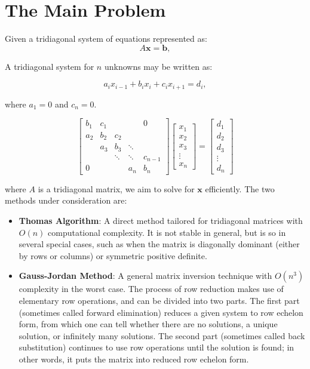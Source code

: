 \documentclass[a4paper,12pt]{article}
\begin{document}
\section*{The Main Problem}
Given a tridiagonal system of equations represented as:
\[
A \mathbf{x} = \mathbf{b},
\]

A tridiagonal system for \( n \) unknowns may be written as:

\[
a_i x_{i-1} + b_i x_i + c_i x_{i+1} = d_i,
\]

where \( a_1 = 0 \) and \( c_n = 0 \).

\[
\begin{bmatrix}
b_{1} & c_{1} & & & 0 \\
a_{2} & b_{2} & c_{2} & & \\
& a_{3} & b_{3} & \ddots & \\
& & \ddots & \ddots & c_{n-1} \\
0 & & & a_{n} & b_{n}
\end{bmatrix}
\begin{bmatrix}
x_{1} \\ x_{2} \\ x_{3} \\ \vdots \\ x_{n}
\end{bmatrix}
=
\begin{bmatrix}
d_{1} \\ d_{2} \\ d_{3} \\ \vdots \\ d_{n}
\end{bmatrix}
\]

where \(A\) is a tridiagonal matrix, we aim to solve for \(\mathbf{x}\) efficiently. The two methods under consideration are:
\begin{itemize}
    \item \textbf{Thomas Algorithm}: A direct method tailored for tridiagonal matrices with \(O(n)\) computational complexity. It is not stable in general, but is so in several special cases, such as when the matrix is diagonally dominant (either by rows or columns) or symmetric positive definite.
    \item \textbf{Gauss-Jordan Method}: A general matrix inversion technique with \(O(n^3)\) complexity in the worst case. The process of row reduction makes use of elementary row operations, and can be divided into two parts. The first part (sometimes called forward elimination) reduces a given system to row echelon form, from which one can tell whether there are no solutions, a unique solution, or infinitely many solutions. The second part (sometimes called back substitution) continues to use row operations until the solution is found; in other words, it puts the matrix into reduced row echelon form.
\end{itemize}
\end{document}
